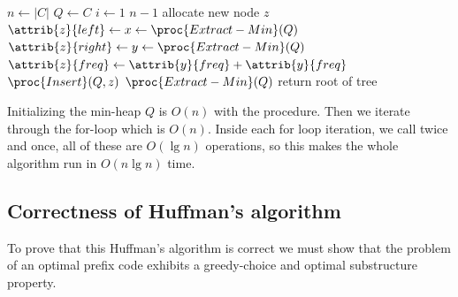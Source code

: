 \documentclass[11pt]{article}
\theoremstyle{definition}
\begin{document}
\begin{codebox}
  \li \(n \gets |C|\)
  \li \(Q \gets C\)
  \li \For \(i \gets 1\) \To \(n-1\) \Do
    \li allocate new node \(z\)
    \li \(\attrib{z}{left} \gets x \gets \proc{Extract-Min}(Q)\)
    \li \(\attrib{z}{right} \gets y \gets \proc{Extract-Min}(Q)\)
    \li \(\attrib{z}{freq} \gets \attrib{y}{freq} + \attrib{y}{freq}\)
    \li \(\proc{Insert}(Q,z)\) \End 
  \li \Return \(\proc{Extract-Min}(Q)\) \Comment return root of tree
\end{codebox}

Initializing the min-heap \(Q\) is \(O(n)\) with the  procedure.  Then we 
iterate through the for-loop which is \(O(n)\).  Inside each for loop iteration, we call 
 twice and  once, all of these are \(O(\lg n)\) operations, so this 
makes the whole  algorithm run in \(O(n \lg n)\) time.

\subsection*{Correctness of Huffman's algorithm}
To prove that this Huffman's algorithm is correct we must show that the problem of an optimal 
prefix code exhibits a greedy-choice and optimal substructure property.
\end{document}
